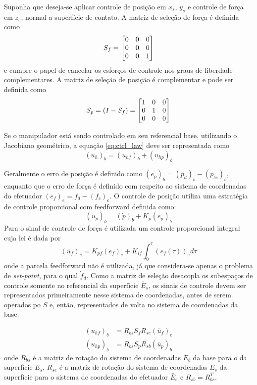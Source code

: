 Suponha que deseja-se aplicar controle de posição em $x_s$, $y_s$ e controle de força em $z_s$, normal a superfície de contato. A matriz de seleção de força é definida como
\begin{equation}
S_f = \begin{bmatrix}
    0 & 0 & 0 \\
    0 & 0 & 0 \\
    0 & 0 & 1 
\end{bmatrix}
\end{equation}
e cumpre o papel de cancelar os esforços de controle nos graus de liberdade complementares. A matriz de seleção de posição é complementar e pode ser definida como
\begin{equation}
S_p = (I - S_f) = \begin{bmatrix}
    1 & 0 & 0 \\
    0 & 1 & 0 \\
    0 & 0 & 0 
\end{bmatrix}
\end{equation}

Se o manipulador está sendo controlado em seu referencial base, utilizando o Jacobiano geométrico, a equação \eqref{eq:ctrl_law} deve ser representada como 
\begin{equation}
({u}_h)_b = ({u}_{hf})_b + ({u}_{hp})_b
\end{equation}

Geralmente o erro de posição é definido como $(e_p)_b = (p_d)_b - (p_{be})_b$, enquanto que o erro de força é definido com respeito ao sistema de coordenadas do efetuador  $(e_f)_e = f_d - (f_{c})_e$. O controle de posição utiliza uma estratégia de controle proporcional com feedforward definida como:
\begin{equation}
(\bar{u}_p)_b = (\dot{p})_b + K_{p} (e_p)_b
\end{equation}
Para o sinal de controle de força é utilizada um controle proporcional integral cuja lei é dada por 
\begin{equation}
(\bar{u}_f)_e = K_{pf} (e_f)_e + K_{if} \int^{\tau}_0 (e_f(\tau))_e d\tau
\end{equation}
onde a parcela feedforward não é utilizada, já que considera-se apenas o problema de \textit{set-point}, para o qual $\dot{f}_d$. Como a matriz de seleção desacopla os subespaços de controle somente no referencial da superfície $\bar{E}_s$, os sinais de controle devem ser representados primeiramente nesse sistema de coordenadas, antes de serem operados po $S$ e, então, representados de volta no sistema de coordenadas da base.

\begin{align}
({u}_{hf})_b &= R_{bs} S_f R_{se} (\bar{u}_f)_e \\
({u}_{hp})_b &= R_{bs} S_p R_{sb} (\bar{u}_p)_b 
\end{align}
onde $R_{bs}$ é a matriz de rotação do sistema de coordenadas $\bar{E}_b$ da base para o da superfície $\bar{E}_s$,   $R_{se}$ é a matriz de rotação do sistema de coordenadas $\bar{E}_s$ da superfície para o sistema de coordenadas do efetuador $\bar{E}_e$ e $R_{sb} = R_{bs}^T$. 

